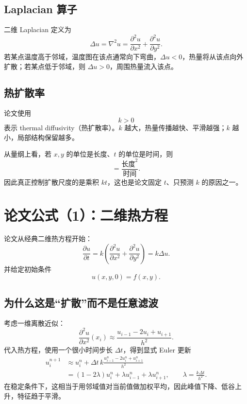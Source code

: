 \documentclass[UTF8,12pt,a4paper,fontset=none]{ctexart}
\numberwithin{equation}{section}
\newcommand{\pd}{\partial}
\begin{document}
\subsection{Laplacian 算子}

二维 Laplacian 定义为
\begin{equation}
  \Delta u
  =\nabla^2u
  =\frac{\pd^2u}{\pd x^2}
  +\frac{\pd^2u}{\pd y^2}.
\end{equation}
若某点温度高于邻域，温度图在该点通常向下弯曲，$\Delta u<0$，热量将从该点向外扩散；若某点低于邻域，则 $\Delta u>0$，周围热量流入该点。

\subsection{热扩散率}

论文使用
\begin{equation}
  k>0
\end{equation}
表示 thermal diffusivity（热扩散率）。$k$ 越大，热量传播越快、平滑越强；$k$ 越小，局部结构保留越多。

从量纲上看，若 $x,y$ 的单位是长度、$t$ 的单位是时间，则
\begin{equation}
  [k]=\frac{\text{长度}^2}{\text{时间}}.
\end{equation}
因此真正控制扩散尺度的是乘积 $kt$，这也是论文固定 $t$、只预测 $k$ 的原因之一。

\section{论文公式（1）：二维热方程}

论文从经典二维热方程开始：
\begin{equation}
  \frac{\pd u}{\pd t}
  =k\left(
  \frac{\pd^2u}{\pd x^2}
  +\frac{\pd^2u}{\pd y^2}
  \right)
  =k\Delta u.
  \tag{1}
  \label{eq:paper1}
\end{equation}
并给定初始条件
\begin{equation}
  u(x,y,0)=f(x,y).
  \label{eq:init}
\end{equation}

\subsection{为什么这是“扩散”而不是任意滤波}

考虑一维离散近似：
\begin{equation}
  \frac{\pd^2u}{\pd x^2}(x_i)
  \approx
  \frac{u_{i-1}-2u_i+u_{i+1}}{h^2}.
\end{equation}
代入热方程，使用一个很小时间步长 $\Delta t$，得到显式 Euler 更新
\begin{align}
  u_i^{n+1}
  &\approx u_i^n
  +\Delta t\,k
  \frac{u_{i-1}^n-2u_i^n+u_{i+1}^n}{h^2}\\
  &=\left(1-2\lambda\right)u_i^n
  +\lambda u_{i-1}^n
  +\lambda u_{i+1}^n,
  \qquad
  \lambda=\frac{k\Delta t}{h^2}.
\end{align}
在稳定条件下，这相当于用邻域值对当前值做加权平均，因此峰值下降、低谷上升，特征趋于平滑。
\end{document}
